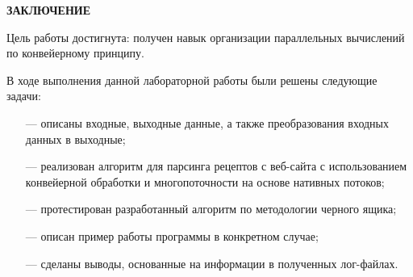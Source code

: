 \begin{center}
    \textbf{ЗАКЛЮЧЕНИЕ}
\end{center}

Цель работы достигнута: получен навык организации параллельных вычислений по конвейерному принципу.

\vspace{5mm}

В ходе выполнения данной лабораторной работы были решены следующие задачи:
\begin{itemize}
	\item[---] описаны входные, выходные данные, а также преобразования входных данных в выходные;
	\item[---] реализован алгоритм для парсинга рецептов с веб-сайта с использованием конвейерной обработки и многопоточности на основе нативных потоков;
	\item[---] протестирован разработанный алгоритм по методологии черного ящика;
    \item[---] описан пример работы программы в конкретном случае;
    \item[---] сделаны выводы, основанные на информации в полученных лог-файлах.
\end{itemize}
